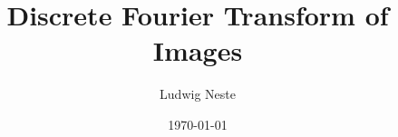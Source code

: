 \documentclass[aspectratio=169]{beamer}
\title{Discrete Fourier Transform of Images}
\date{\today}
\author{Ludwig Neste}
\institute{\colorbox{mDarkTeal}{\texttt{[image: su\_logo.pdf]}}}
\begin{document}
\begin{frame}
  \titlepage
\end{frame}





\begin{frame}
  \nocite{*}
  \printbibliography
\end{frame}
\end{document}
